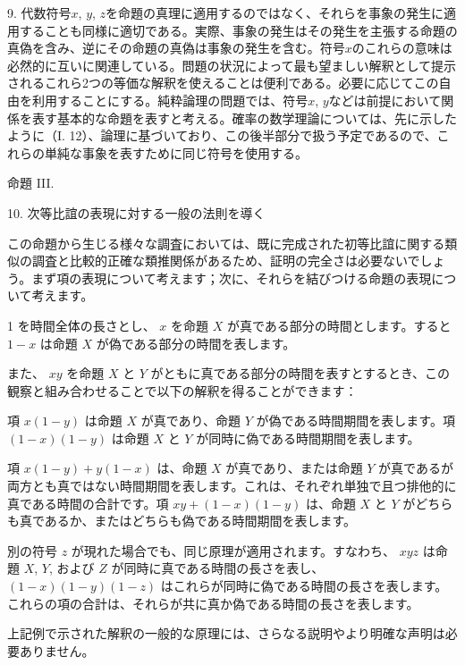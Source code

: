 \documentclass[a4paper,11pt,openany]{ltjsbook}
\begin{document}
9. 代数符号$x$, $y$, $z$を命題の真理に適用するのではなく、それらを事象の発生に適用することも同様に適切である。実際、事象の発生はその発生を主張する命題の真偽を含み、逆にその命題の真偽は事象の発生を含む。符号$x$のこれらの意味は必然的に互いに関連している。問題の状況によって最も望ましい解釈として提示されるこれら2つの等価な解釈を使えることは便利である。必要に応じてこの自由を利用することにする。純粋論理の問題では、符号$x$, $y$などは前提において関係を表す基本的な命題を表すと考える。確率の数学理論については、先に示したように（I. 12）、論理に基づいており、この後半部分で扱う予定であるので、これらの単純な事象を表すために同じ符号を使用する。

\begin{center}
\textsc{命題 III.}
\end{center}

10. 次等比誼の表現に対する一般の法則を導く

この命題から生じる様々な調査においては、既に完成された初等比誼に関する類似の調査と比較的正確な類推関係があるため、証明の完全さは必要ないでしょう。まず項の表現について考えます；次に、それらを結びつける命題の表現について考えます。

1 を時間全体の長さとし、 \( x \) を命題 \( X \) が真である部分の時間とします。すると \( 1 - x \) は命題 \( X \) が偽である部分の時間を表します。

また、 \( xy \) を命題 \( X \) と \( Y \) がともに真である部分の時間を表すとするとき、この観察と組み合わせることで以下の解釈を得ることができます：

項 \( x(1-y) \) は命題 \( X \) が真であり、命題 \( Y \) が偽である時間期間を表します。項 \( (1-x)(1-y) \) は命題 \( X \) と \( Y \) が同時に偽である時間期間を表します。

項 \( x(1-y) + y(1-x) \) は、命題 \( X \) が真であり、または命題 \( Y \) が真であるが両方とも真ではない時間期間を表します。これは、それぞれ単独で且つ排他的に真である時間の合計です。項 \( xy + (1-x)(1-y) \) は、命題 \( X \) と \( Y \) がどちらも真であるか、またはどちらも偽である時間期間を表します。

別の符号 \( z \) が現れた場合でも、同じ原理が適用されます。すなわち、 \( xyz \) は命題 \( X \), \( Y \), および \( Z \) が同時に真である時間の長さを表し、 \( (1-x)(1-y)(1-z) \) はこれらが同時に偽である時間の長さを表します。これらの項の合計は、それらが共に真か偽である時間の長さを表します。

上記例で示された解釈の一般的な原理には、さらなる説明やより明確な声明は必要ありません。
\end{document}
